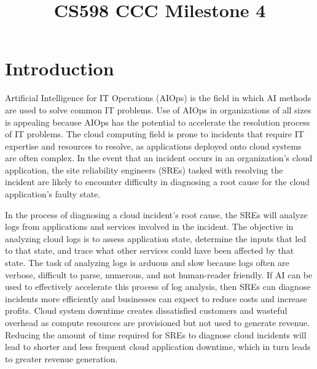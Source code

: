 \documentclass[conference]{IEEEtran}
\begin{document}
\title{CS598 CCC Milestone 4\\
}

\author{
\and
{}
\and
{}
}
\maketitle


\section{Introduction} \label{sec:introduction}

Artificial Intelligence for IT Operations (AIOps) is the field in which AI methods are used to solve common IT problems. Use of AIOps in organizations of all sizes is appealing because AIOps has the potential to accelerate the resolution process of IT problems. The cloud computing field is prone to incidents that require IT expertise and resources to resolve, as applications deployed onto cloud systems are often complex. In the event that an incident occurs in an organization's cloud application, the site reliability engineers (SREs) tasked with resolving the incident are likely to encounter difficulty in diagnosing a root cause for the cloud application's faulty state. \cite{chen2020aiops} \cite{mani2023enhancing}

In the process of diagnosing a cloud incident's root cause, the SREs will analyze logs from applications and services involved in the incident. The objective in analyzing cloud logs is to assess application state, determine the inputs that led to that state, and trace what other services could have been affected by that state. The task of analyzing logs is arduous and slow because logs often are verbose, difficult to parse, numerous, and not human-reader friendly. If AI can be used to effectively accelerate this process of log analysis, then SREs can diagnose incidents more efficiently and businesses can expect to reduce costs and increase profits. \cite{10212414} \cite{gupta2023learning} Cloud system downtime creates dissatisfied customers and wasteful overhead as compute resources are provisioned but not used to generate revenue. \cite{li2022an} Reducing the amount of time required for SREs to diagnose cloud incidents will lead to shorter and less frequent cloud application downtime, which in turn leads to greater revenue generation.
\end{document}

